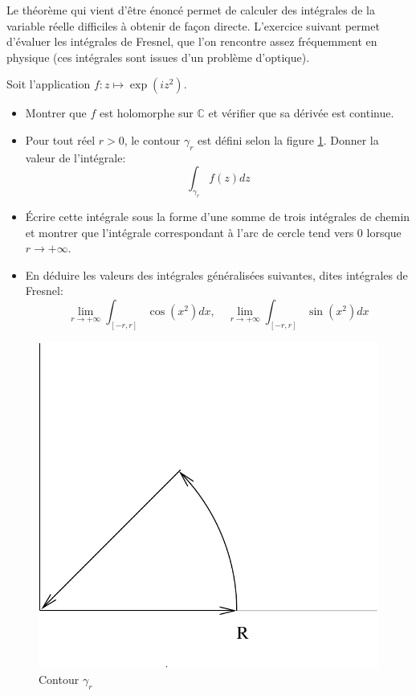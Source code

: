 Le théorème qui vient d'être énoncé permet de calculer des intégrales de la
variable réelle difficiles à obtenir de façon directe. L'exercice suivant permet 
d'évaluer les intégrales de Fresnel, que l'on rencontre assez fréquemment en
physique (ces intégrales sont issues d'un problème d'optique).
\begin{exercice}
Soit l'application $f \colon z \mapsto \exp\left(i z^2\right)$. 
\begin{itemize}
  \item Montrer que $f$ est holomorphe sur $\mathbb{C}$ et vérifier que sa
  dérivée est continue.
  \item Pour tout réel $r > 0$, le contour $\gamma_r$ est défini selon la figure
  \ref{fig:contour2}. Donner la valeur de l'intégrale:
  \[
  \int_{\gamma_r} f(z) dz
  \]
  \item Écrire cette intégrale sous la forme d'une somme de trois
  intégrales de chemin et montrer que l'intégrale correspondant à l'arc de
  cercle tend vers 0 lorsque $r \to +\infty$.
  \item En déduire les valeurs des intégrales généralisées suivantes, dites
  intégrales de Fresnel:
  \[
  \lim_{r \to +\infty} \int_{[-r,r]} \cos(x^2) dx, \quad  \lim_{r \to +\infty}
  \int_{[-r,r]} \sin(x^2) dx
  \]
\end{itemize}
\end{exercice}
 \begin{figure}[ht]
\includegraphics[scale=0.3]{images/contour_fresnel.pdf}
\caption{Contour $\gamma_r$}\label{fig:contour2}
\end{figure}
